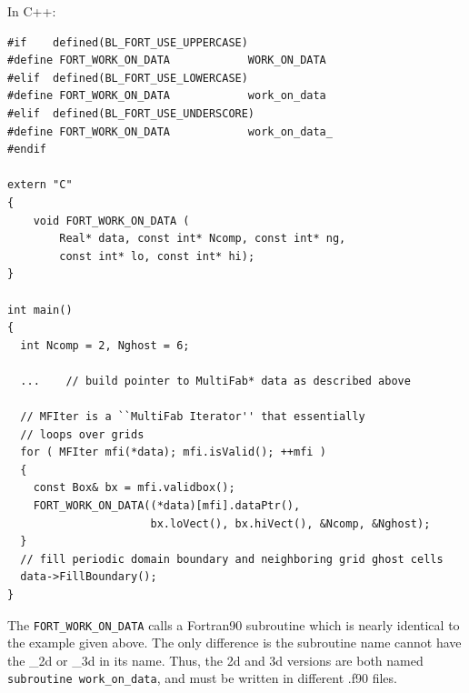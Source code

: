 In C++:
\begin{lstlisting}[language={[gnu]make},mathescape=false]
#if    defined(BL_FORT_USE_UPPERCASE)
#define FORT_WORK_ON_DATA            WORK_ON_DATA
#elif  defined(BL_FORT_USE_LOWERCASE)
#define FORT_WORK_ON_DATA            work_on_data
#elif  defined(BL_FORT_USE_UNDERSCORE)
#define FORT_WORK_ON_DATA            work_on_data_
#endif

extern "C"
{
    void FORT_WORK_ON_DATA (
        Real* data, const int* Ncomp, const int* ng,
        const int* lo, const int* hi);
}

int main()
{
  int Ncomp = 2, Nghost = 6;

  ...    // build pointer to MultiFab* data as described above
  
  // MFIter is a ``MultiFab Iterator'' that essentially
  // loops over grids
  for ( MFIter mfi(*data); mfi.isValid(); ++mfi )
  {
    const Box& bx = mfi.validbox();
    FORT_WORK_ON_DATA((*data)[mfi].dataPtr(),
                      bx.loVect(), bx.hiVect(), &Ncomp, &Nghost);
  }
  // fill periodic domain boundary and neighboring grid ghost cells
  data->FillBoundary();
}
\end{lstlisting}
The {\tt FORT\_WORK\_ON\_DATA} calls a Fortran90 subroutine which is nearly
identical to the example given above.  The only difference is the subroutine
name cannot have the \_2d or \_3d in its name.  Thus, the 2d and 3d versions
are both named {\tt subroutine work\_on\_data}, and must be written in
different .f90 files.


